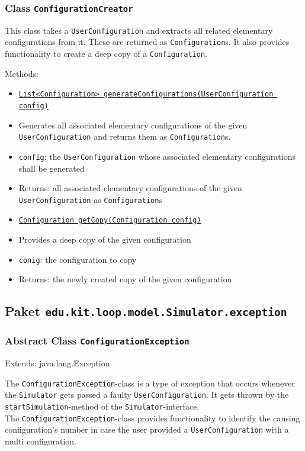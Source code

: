 \documentclass[parskip=full,11pt]{scrartcl}
\begin{document}
\subsubsection{Class \texttt{ConfigurationCreator}}
This class takes a \texttt{UserConfiguration} and extracts all related elementary configurations from it. These are returned as \texttt{Configuration}s. It also provides functionality to create a deep copy of a \texttt{Configuration}.

Methods:
\begin{itemize}\itemsep -10pt
\item \underline{\texttt{List<Configuration> generateConfigurations(UserConfiguration config)}}
\item[] Generates all associated elementary configurations of the given \texttt{UserConfiguration} and returns them as \texttt{Configuration}s.
\item[] \texttt{config}: the \texttt{UserConfiguration} whose associated elementary configurations shall be generated
\item[] Returns: all associated elementary configurations of the given \texttt{UserConfiguration} as \texttt{Configuration}s

\item \underline{\texttt{Configuration getCopy(Configuration config)}}
\item[] Provides a deep copy of the given configuration
\item[] \texttt{conig}: the configuration to copy
\item[] Returns: the newly created copy of the given configuration
\end{itemize}

\subsection{Paket \texttt{edu.kit.loop.model.Simulator.exception}}

\subsubsection{Abstract Class \texttt{ConfigurationException }}
Extends: java.lang.Exception

The \texttt{ConfigurationException}-class is a type of exception that occurs whenever the \texttt{Simulator} gets passed a faulty \texttt{UserConfiguration}. It gets thrown by the \texttt{startSimulation}-method of the \texttt{Simulator}-interface.\\
The \texttt{ConfigurationException}-class provides functionality to identify the causing configuration's number in case the user provided a \texttt{UserConfiguration} with a multi configuration.
\end{document}
